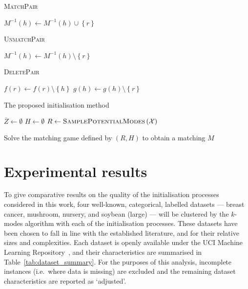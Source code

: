 \documentclass[11pt]{article}
\newcommand{\balg}{\begin{algorithm}[htbp]\DontPrintSemicolon}
\newcommand{\ealg}{\end{algorithm}}
\begin{document}
\balg%
    \caption{\textsc{MatchPair}}\label{alg:match}

    \(M^{-1}(h) \gets M^{-1}(h) \cup \left\{r\right\}\)\;
\ealg%

\balg%
    \caption{\textsc{UnmatchPair}}\label{alg:unmatch}

    \(M^{-1}(h) \gets M^{-1}(h) \setminus \left\{r\right\}\)\;
\ealg%

\balg%
    \caption{\textsc{DeletePair}}\label{alg:delete}

    \(f(r) \gets f(r) \setminus \left\{h\right\}\)\;
    \(g(h) \gets g(h) \setminus \left\{r\right\}\)\;
\ealg%

\balg%
    \caption{The proposed initialisation method}\label{alg:proposed_method}

    \(\overline Z \gets \emptyset\)\;
    \(H \gets \emptyset\)\;
    \(R \gets \textsc{SamplePotentialModes}\left(\mathcal{X}\right)\)\;



    Solve the matching game defined by \((R, H)\) to obtain a matching \(M\)\;
\ealg%


\section{Experimental results}\label{sec:results}
\graphicspath{{./img/}}

To give comparative results on the quality of the initialisation processes
considered in this work, four well-known, categorical, labelled datasets ---
breast cancer, mushroom, nursery, and soybean (large) --- will be clustered by
the \(k\)-modes algorithm with each of the initialisation processes. These
datasets have been chosen to fall in line with the established literature, and
for their relative sizes and complexities. Each dataset is openly available
under the UCI Machine Learning Repository~\cite{Dua2019}, and their
characteristics are summarised in Table~\ref{tab:dataset_summary}. For the
purposes of this analysis, incomplete instances (i.e.\ where data is missing)
are excluded and the remaining dataset characteristics are reported as
`adjusted'.
\end{document}
